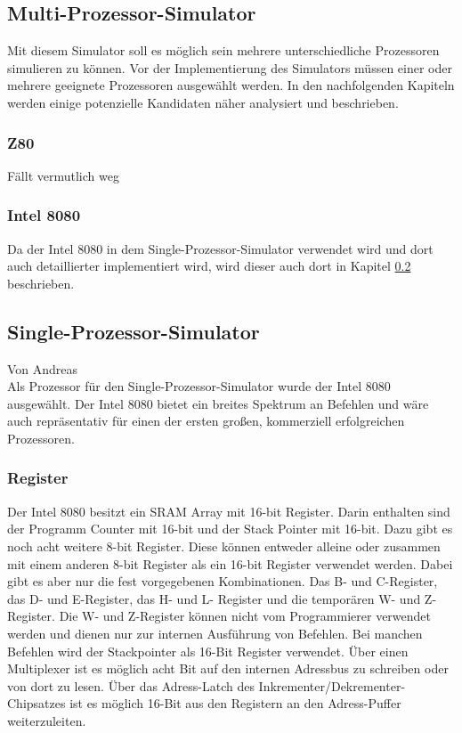 \documentclass[12pt]{article}
\begin{document}
\newpage

\subsection{Multi-Prozessor-Simulator}
Mit diesem Simulator soll es möglich sein mehrere unterschiedliche Prozessoren simulieren zu können. Vor der Implementierung des Simulators müssen einer oder mehrere geeignete Prozessoren ausgewählt werden. In den nachfolgenden Kapiteln werden einige potenzielle Kandidaten näher analysiert und beschrieben.

\subsubsection{Z80}
Fällt vermutlich weg

\subsubsection{Intel 8080}
Da der Intel 8080 in dem Single-Prozessor-Simulator verwendet wird und dort auch detaillierter implementiert wird, wird dieser auch dort in Kapitel \ref{SPS} beschrieben.


\newpage

\subsection{Single-Prozessor-Simulator}
\label{SPS} 
Von Andreas\\ 

\noindent
Als Prozessor für den Single-Prozessor-Simulator wurde der Intel 8080 ausgewählt. Der Intel 8080 bietet ein breites Spektrum an Befehlen und wäre auch repräsentativ für einen der ersten großen, kommerziell erfolgreichen Prozessoren.

\subsubsection{Register}
\label{RegisterSection}

Der Intel 8080 besitzt ein SRAM Array mit 16-bit Register. Darin enthalten sind der Programm Counter mit 16-bit und der Stack Pointer mit 16-bit. Dazu gibt es noch acht weitere 8-bit Register. Diese können entweder alleine oder zusammen mit einem anderen 8-bit Register als ein 16-bit Register verwendet werden. Dabei gibt es aber nur die fest vorgegebenen Kombinationen. Das B- und C-Register, das D- und E-Register, das H- und L- Register und die temporären W- und Z- Register. Die W- und Z-Register können nicht vom Programmierer verwendet werden und dienen nur zur internen Ausführung von Befehlen. Bei manchen Befehlen wird der Stackpointer als 16-Bit Register verwendet.
Über einen Multiplexer ist es möglich acht Bit auf den internen Adressbus zu schreiben oder von dort zu lesen. Über das Adress-Latch des Inkrementer/Dekrementer-Chipsatzes ist es möglich 16-Bit aus den Registern an den Adress-Puffer weiterzuleiten. \cite{IntMan16}
\end{document}
